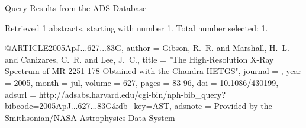 Query Results from the ADS Database


Retrieved 1 abstracts, starting with number 1.  Total number selected: 1.

@ARTICLE{2005ApJ...627...83G,
   author = {{Gibson}, R.~R. and {Marshall}, H.~L. and {Canizares}, C.~R. and 
	{Lee}, J.~C.},
    title = "{The High-Resolution X-Ray Spectrum of MR 2251-178 Obtained with the Chandra HETGS}",
  journal = {\apj},
     year = 2005,
    month = jul,
   volume = 627,
    pages = {83-96},
      doi = {10.1086/430199},
   adsurl = {http://adsabs.harvard.edu/cgi-bin/nph-bib_query?bibcode=2005ApJ...627...83G&db_key=AST},
  adsnote = {Provided by the Smithsonian/NASA Astrophysics Data System}
}


